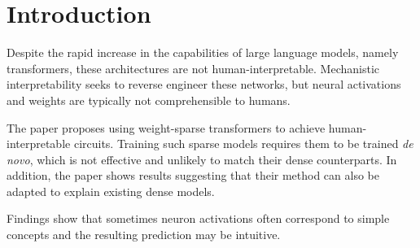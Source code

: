 \documentclass[a4paper,oneside,10pt,english]{scrartcl}
\begin{document}









\cleardoubleoddpage

\section{Introduction}
\label{sec:introduction}

Despite the rapid increase in the capabilities of large language models, namely transformers, these architectures are not human-interpretable. Mechanistic interpretability seeks to reverse engineer these networks, but neural activations and weights are typically not comprehensible to humans. \par 
The paper \textcite{gao2025weightsparsetransformersinterpretablecircuits} proposes using weight-sparse transformers to achieve human-interpretable circuits. Training such sparse models requires them  to be trained \textit{de novo}, which is not effective and unlikely to match their dense counterparts. In addition, the paper shows results suggesting that their method can also be adapted to explain existing dense models. \par
Findings show that sometimes neuron activations often correspond to simple concepts and the resulting prediction may be intuitive. 
\end{document}

